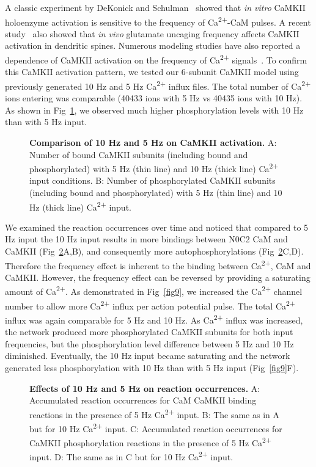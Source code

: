 \documentclass[10pt,letterpaper]{article}
\begin{document}
A classic experiment by DeKonick and Schulman~\cite{DeKoninck:1998wh} showed that \textit{in vitro} CaMKII holoenzyme activation is sensitive to the frequency of Ca\textsuperscript{2+}-CaM pulses. A recent study~\cite{Fujii:2013bg} also showed that \textit{in vivo} glutamate uncaging frequency affects CaMKII activation in dendritic spines. Numerous modeling studies have also reported a dependence of CaMKII activation on the frequency of Ca\textsuperscript{2+} signals~\cite{Pepke:2010ju,Dupont:2003vq,Michalski:2012ds,Kubota:2001ul}. To confirm this CaMKII activation pattern, we tested our 6-subunit CaMKII model using previously generated 10 Hz and 5 Hz Ca\textsuperscript{2+} influx files. The total number of Ca\textsuperscript{2+} ions entering was comparable (40433 ions with 5 Hz vs 40435 ions with 10 Hz). As shown in Fig~\ref{fig7}, we observed much higher phosphorylation levels with 10 Hz than with 5 Hz input.

\begin{figure}[!h]
	\caption{{\bf Comparison of 10 Hz and 5 Hz on CaMKII activation.}
	A: Number of bound CaMKII subunits (including bound and phosphorylated) with 5 Hz (thin line) and 10 Hz (thick line) Ca\textsuperscript{2+} input conditions.
	B: Number of phosphorylated CaMKII subunits (including bound and phosphorylated) with 5 Hz (thin line) and 10 Hz (thick line) Ca\textsuperscript{2+} input.
	}
\label{fig7}
\end{figure}

We examined the reaction occurrences over time and noticed that compared to 5 Hz input the 10 Hz input results in more bindings between N0C2 CaM and CaMKII (Fig~\ref{fig8}A,B), and consequently more autophosphorylations (Fig~\ref{fig8}C,D). Therefore the frequency effect is inherent to the binding between Ca\textsuperscript{2+}, CaM and CaMKII. However, the frequency effect can be reversed by providing a saturating amount of Ca\textsuperscript{2+}. As demonstrated in Fig~\ref{fig9}, we increased the Ca\textsuperscript{2+} channel number to allow more Ca\textsuperscript{2+} influx per action potential pulse. The total Ca\textsuperscript{2+} influx was again comparable for 5 Hz and 10 Hz. As Ca\textsuperscript{2+} influx was increased, the network produced more phosphorylated CaMKII subunits for both input frequencies, but the phosphorylation level difference between 5 Hz and 10 Hz diminished. Eventually, the 10 Hz input became saturating and the network generated less phosphorylation with 10 Hz than with 5 Hz input (Fig~\ref{fig9}F).
\begin{figure}[!h]
	\caption{{\bf Effects of 10 Hz and 5 Hz on reaction occurrences.} 
	A: Accumulated reaction occurrences for CaM CaMKII binding reactions in the presence of 5 Hz Ca\textsuperscript{2+} input. 
	B: The same as in A but for 10 Hz Ca\textsuperscript{2+} input.
	C: Accumulated reaction occurrences for CaMKII phosphorylation reactions in the presence of 5 Hz Ca\textsuperscript{2+} input. 
	D: The same as in C but for 10 Hz Ca\textsuperscript{2+} input.
	}
\label{fig8}
\end{figure}
\end{document}
